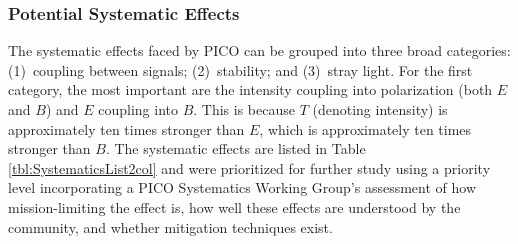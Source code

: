 \documentclass[PICOReport.tex]{subfiles}
\begin{document}





\subsubsection{Potential Systematic Effects}
\label{sec:systematics_list}


The systematic effects faced by PICO can be grouped into three broad categories: (1)~coupling between signals; (2)~stability; and (3)~stray light. For the first category, the most important are the intensity coupling into polarization (both $E$ and $B$) and $E$ coupling into $B$. This is because $T$ (denoting intensity) is approximately ten times stronger than $E$, which is approximately ten times stronger than $B$. The systematic effects are listed in Table \ref{tbl:SystematicsList2col} and were prioritized for further study using a priority level incorporating a PICO Systematics Working Group's assessment of how mission-limiting the effect is, how well these effects are understood by the community, and whether mitigation techniques exist.  
\end{document}
